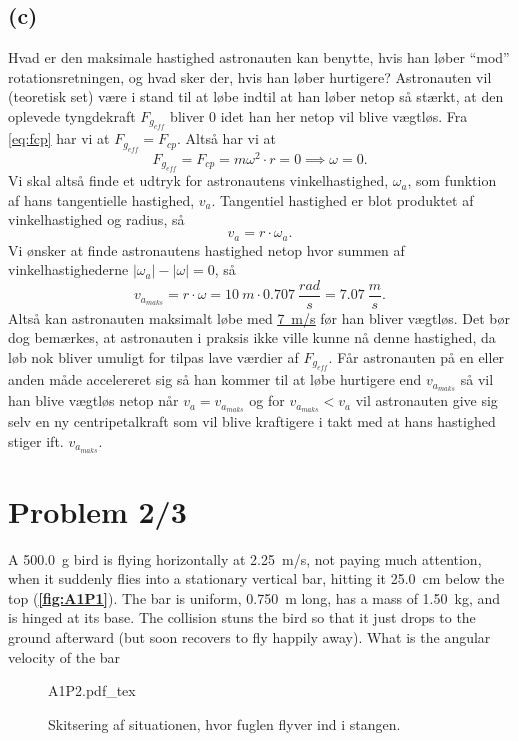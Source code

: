 \documentclass[12pt]{article}
\newcommand{\incfig}[2][1]{%
  \def\svgwidth{#1\columnwidth}
  {#2.pdf_tex}
}
\theoremstyle{definition}
\begin{document}
\subsection*{(c)}
Hvad er den maksimale hastighed astronauten kan benytte, hvis han løber ``mod'' rotationsretningen, og hvad sker der, hvis han løber hurtigere? 
\bigbreak
Astronauten vil (teoretisk set) være i stand til at løbe indtil at han løber netop så stærkt, at den oplevede tyngdekraft $F_{g_{eff}}$ bliver 0 idet han her netop vil blive vægtløs. Fra \autoref{eq:fcp} har vi at $F_{g_{eff}} = F_{cp}$. Altså har vi at
\[ 
  F_{g_{eff}} = F_{cp} = m\omega^2 \cdot r = 0 \implies \omega = 0
.\]
Vi skal altså finde et udtryk for astronautens vinkelhastighed, $\omega_a$, som funktion af hans tangentielle hastighed, $v_a$. Tangentiel hastighed er blot produktet af vinkelhastighed og radius, så
\[ 
v_{a} = r\cdot \omega_{a}
.\]
Vi ønsker at finde astronautens hastighed netop hvor summen af vinkelhastighederne $|\omega_a| - |\omega| = 0$, så
\[ 
  v_{a_{maks}} = r \cdot \omega = \qty{10}{m} \cdot \qty{0,707}{\frac{rad}{s}}  = \qty{7,07}{\frac{m}{s}}  
.\]
Altså kan astronauten maksimalt løbe med \underline{\underline{\qty{7}{m/s}}} før han bliver vægtløs. 
\bigbreak
Det bør dog bemærkes, at astronauten i praksis ikke ville kunne nå denne hastighed, da løb nok bliver umuligt for tilpas lave værdier af $F_{g_{eff}}$. Får astronauten på en eller anden måde accelereret sig så han kommer til at løbe hurtigere end $v_{a_{maks}}$ så vil han blive vægtløs netop når $v_a = v_{a_{maks}}$ og for $v_{a_{maks}}<v_a$ vil astronauten give sig selv en ny centripetalkraft som vil blive kraftigere i takt med at hans hastighed stiger ift. $v_{a_{maks}}$.

\section*{Problem 2/3}
A \qty{500,0}{g} bird is flying horizontally at \qty{2,25}{m/s}, not paying much attention, when it suddenly flies into a stationary vertical bar, hitting it \qty{25,0}{cm} below the top (\textbf{\autoref{fig:A1P1}}). The bar is uniform, \qty{0,750}{m} long, has a mass of \qty{1,50}{kg}, and is hinged at its base. The collision stuns the bird so that it just drops to the ground afterward (but soon recovers to fly happily away). What is the angular velocity of the bar

\begin{figure}[ht]
  \centering
  \incfig[0.4]{A1P2}
  \caption{Skitsering af situationen, hvor fuglen flyver ind i stangen.}
  \label{fig:A1P2}
\end{figure}
\end{document}
